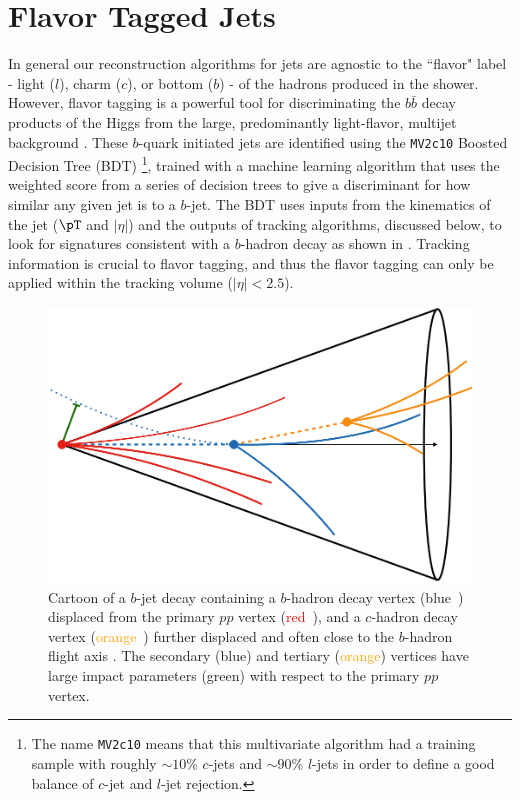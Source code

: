 \section{Flavor Tagged Jets} \label{sec:objects:flavor_tagging}

In general our reconstruction algorithms for jets are agnostic to the ``flavor"
label - light ($l$), charm ($c$), or bottom ($b$) - of the hadrons produced in
the shower.  However, flavor tagging is a powerful tool for discriminating the
$b\bar{b}$ decay products of the Higgs from the large, predominantly
light-flavor, multijet background \cite{Aad:2015ydr}.  These $b$-quark
initiated jets are identified using the \texttt{MV2c10}
\cite{ATL-PHYS-PUB-2015-022} Boosted Decision Tree (BDT) \footnote{The name
\texttt{MV2c10} means that this multivariate algorithm had a training sample
with roughly $\sim10\%$ $c$-jets and $\sim90\%$ $l$-jets in order to define a
good balance of $c$-jet and $l$-jet rejection.}, trained with a machine learning
algorithm that uses the weighted score from a series of decision trees to give
a discriminant for how similar any given jet is to a $b$-jet.  The BDT uses
inputs from the kinematics of the jet ($\pT$ and $|\eta|$) and the
outputs of tracking algorithms, discussed below, to look for signatures
consistent with a $b$-hadron decay as shown in .
Tracking information is crucial to flavor tagging, and thus the flavor tagging can only be applied
within the tracking volume ($|\eta| < 2.5$).

\begin{figure}[!htbp]
  \centering
  \includegraphics[width=0.8\linewidth]{figures/objects/b_decay}
  \caption{Cartoon of a $b$-jet decay containing a $b$-hadron decay vertex
(\textcolor{track_blue}{blue}~\protect{}) displaced from the
primary $pp$ vertex (\textcolor{red}{red}~\protect{}), and a
$c$-hadron decay vertex (\textcolor{orange}{orange}~\protect{})
further displaced and often close to the $b$-hadron flight axis
\cite{Chisholm:bjet}. The secondary (\textcolor{track_blue}{blue}) and tertiary
(\textcolor{orange}{orange}) vertices have large impact parameters
(\textcolor{IPgreen}{green}) with respect to the primary $pp$ vertex.}
  \label{sec:objects:b_decay}
\end{figure}

